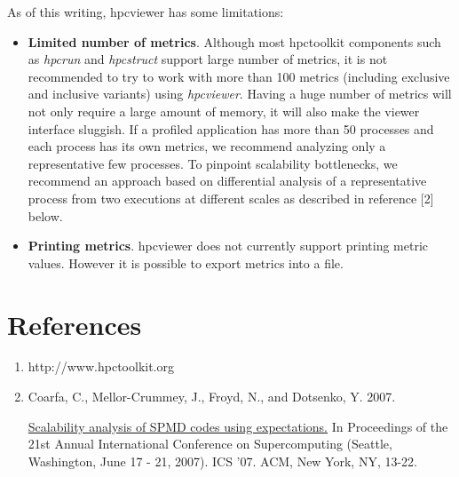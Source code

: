 \documentclass[a4paper,11pt]{article}
\begin{document}
 As of this writing, hpcviewer has some limitations: 
\begin{itemize}
	\item \textbf{Limited number of metrics}. Although most hpctoolkit components such as \textit{hpcrun} and \textit{hpcstruct} support large number of metrics,     it is not recommended to try to work with more than 100 metrics    (including exclusive and inclusive variants) using \textit{hpcviewer}.    Having a huge number of metrics will not only require a large    amount of memory, it will also make the viewer interface sluggish.    If a profiled application has more than 50 processes and each    process has its own metrics, we recommend analyzing only a    representative few processes. To pinpoint scalability bottlenecks,    we recommend an approach based on differential analysis of    a representative process from two    executions at different scales as described in reference [2] below.    
	\item \textbf{Printing metrics}. hpcviewer does not    currently support printing metric values. However it is possible to export metrics into a file.    
\end{itemize}

\section{References}
\begin{enumerate}
	\item http://www.hpctoolkit.org
	\item \hypertarget{scalability}{Coarfa, C., Mellor-Crummey, J., Froyd, N., and Dotsenko, Y. 2007.}\href{http://doi.acm.org/10.1145/1274971.1274976}{Scalability analysis of SPMD codes using expectations.}      In Proceedings of the 21st Annual International Conference on Supercomputing (Seattle, Washington, June 17 - 21, 2007).      ICS '07. ACM, New York, NY, 13-22.
\end{enumerate}
\end{document}
